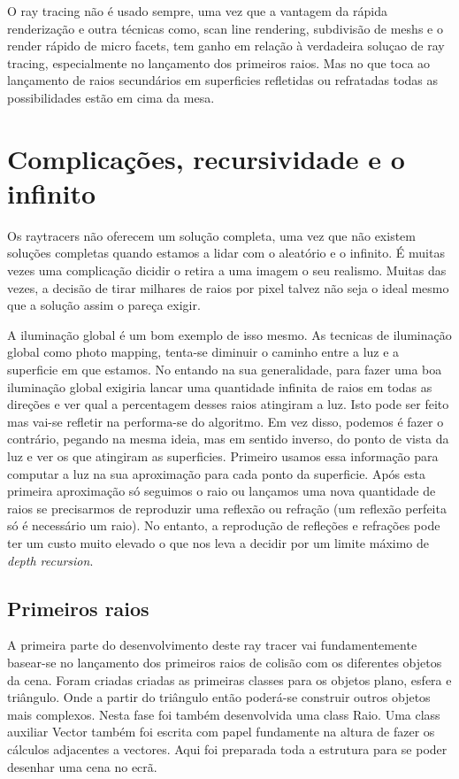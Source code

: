 \documentclass[12pt]{article}
\begin{document}
O ray tracing não é usado sempre, uma vez que a vantagem da rápida renderização e outra técnicas como, scan line rendering, subdivisão de meshs e o render rápido de micro facets, tem ganho em relação à verdadeira soluçao de ray tracing, especialmente no lançamento dos primeiros raios. Mas no que toca ao lançamento de raios secundários em superficies refletidas ou refratadas todas as possibilidades estão em cima da mesa.

\section{Complicações, recursividade e o infinito}
\vspace{10 mm}
\hspace{8 mm}Os raytracers não oferecem um solução completa, uma vez que não existem soluções completas quando estamos a lidar com o aleatório e o infinito. É muitas vezes uma complicação dicidir o retira a uma imagem o seu realismo. Muitas das vezes, a decisão de tirar milhares de raios por pixel talvez não seja o ideal mesmo que a solução assim o pareça exigir.\newline

\hspace{8 mm}A iluminação global é um bom exemplo de isso mesmo. As tecnicas de iluminação global como photo mapping, tenta-se diminuir o caminho entre a luz e a superficie em que estamos. No entando na sua generalidade, para fazer uma boa iluminação global exigiria lancar uma quantidade infinita de raios em todas as direções e ver qual a percentagem desses raios atingiram a luz. Isto pode ser feito mas vai-se refletir na performa-se do algoritmo. Em vez disso, podemos é fazer o contrário, pegando na mesma ideia, mas em sentido inverso, do ponto de vista da luz e ver os que atingiram as superficies. Primeiro usamos essa informação para computar a luz na sua aproximação para cada ponto da superficie. Após esta primeira aproximação só seguimos o raio ou lançamos uma nova quantidade de raios se precisarmos de reproduzir uma reflexão ou refração (um reflexão perfeita só é necessário um raio). No entanto, a reprodução de refleções e refrações pode ter um custo muito elevado o que nos leva a decidir por um limite máximo de {\it depth recursion}.

\subsection{Primeiros raios}
\vspace{10 mm}
\hspace{8 mm} A primeira parte do desenvolvimento deste ray tracer vai fundamentemente basear-se no lançamento dos primeiros raios de colisão com os diferentes objetos da cena. Foram criadas criadas as primeiras classes para os objetos plano, esfera e triângulo. Onde a partir do triângulo então poderá-se construir outros objetos mais complexos. Nesta fase foi também desenvolvida uma class Raio. Uma class auxiliar Vector também foi escrita com papel fundamente na altura de fazer os cálculos adjacentes a vectores.
Aqui foi preparada toda a estrutura para se poder desenhar uma cena no ecrã. \newline
\end{document}
